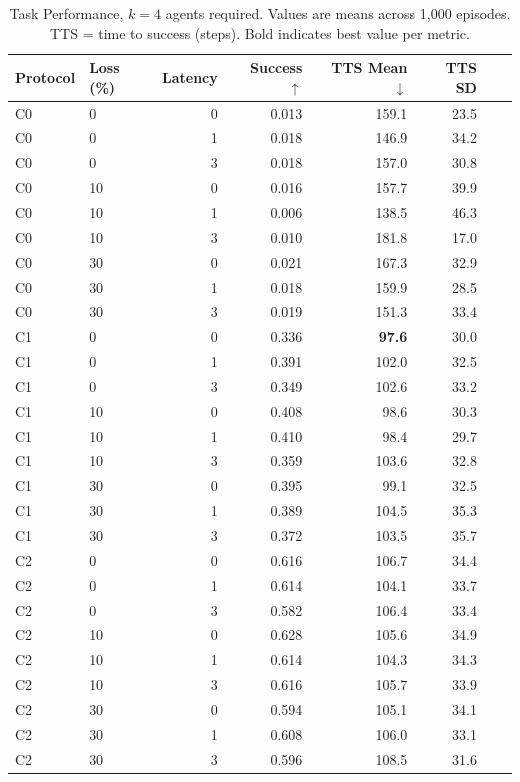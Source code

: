 \documentclass[pdflatex,sn-mathphys-num]{sn-jnl}%
\theoremstyle{thmstyleone}%
\theoremstyle{thmstyletwo}%
\theoremstyle{thmstylethree}%
\begin{document}
\begin{appendices}
\begin{table}[htbp]
\centering
\caption{Task Performance, $k=4$ agents required. Values are means across 1,000 episodes. TTS = time to success (steps). Bold indicates best value per metric.}
\label{tab:appendix_task_c}
\small
\begin{tabular}{llrrrrrr}
\toprule
Protocol & Loss (\%) & Latency & Success $\uparrow$ & TTS Mean $\downarrow$ & TTS SD \\
\midrule
C0 & 0 & 0 & 0.013 & 159.1 & 23.5 \\
C0 & 0 & 1 & 0.018 & 146.9 & 34.2 \\
C0 & 0 & 3 & 0.018 & 157.0 & 30.8 \\
C0 & 10 & 0 & 0.016 & 157.7 & 39.9 \\
C0 & 10 & 1 & 0.006 & 138.5 & 46.3 \\
C0 & 10 & 3 & 0.010 & 181.8 & 17.0 \\
C0 & 30 & 0 & 0.021 & 167.3 & 32.9 \\
C0 & 30 & 1 & 0.018 & 159.9 & 28.5 \\
C0 & 30 & 3 & 0.019 & 151.3 & 33.4 \\
\addlinespace[4pt]
C1 & 0 & 0 & 0.336 & \textbf{97.6} & 30.0 \\
C1 & 0 & 1 & 0.391 & 102.0 & 32.5 \\
C1 & 0 & 3 & 0.349 & 102.6 & 33.2 \\
C1 & 10 & 0 & 0.408 & 98.6 & 30.3 \\
C1 & 10 & 1 & 0.410 & 98.4 & 29.7 \\
C1 & 10 & 3 & 0.359 & 103.6 & 32.8 \\
C1 & 30 & 0 & 0.395 & 99.1 & 32.5 \\
C1 & 30 & 1 & 0.389 & 104.5 & 35.3 \\
C1 & 30 & 3 & 0.372 & 103.5 & 35.7 \\
\addlinespace[4pt]
C2 & 0 & 0 & 0.616 & 106.7 & 34.4 \\
C2 & 0 & 1 & 0.614 & 104.1 & 33.7 \\
C2 & 0 & 3 & 0.582 & 106.4 & 33.4 \\
C2 & 10 & 0 & 0.628 & 105.6 & 34.9 \\
C2 & 10 & 1 & 0.614 & 104.3 & 34.3 \\
C2 & 10 & 3 & 0.616 & 105.7 & 33.9 \\
C2 & 30 & 0 & 0.594 & 105.1 & 34.1 \\
C2 & 30 & 1 & 0.608 & 106.0 & 33.1 \\
C2 & 30 & 3 & 0.596 & 108.5 & 31.6 \\

\end{tabular}
\end{table}
\end{appendices}
\end{document}
